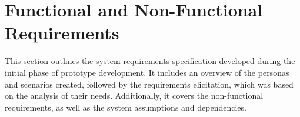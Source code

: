 \section{Functional and Non-Functional Requirements}
\label{section:requirements}
This section outlines the system requirements specification developed during the initial phase of prototype development. It includes an overview of the personas and scenarios created, followed by the requirements elicitation, which was based on the analysis of their needs. Additionally, it covers the non-functional requirements, as well as the system assumptions and dependencies.
